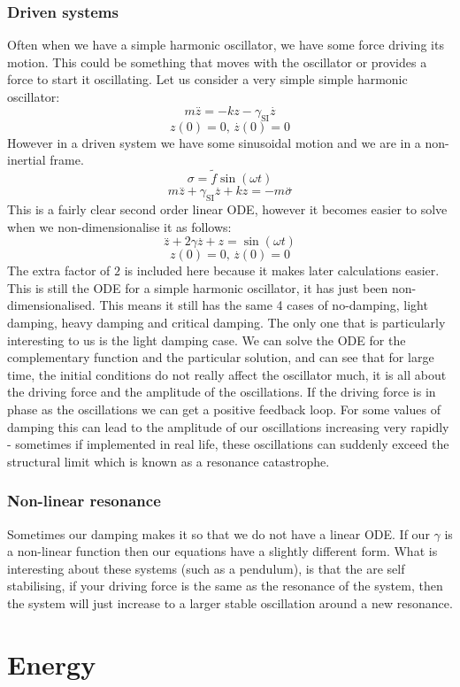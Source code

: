 \documentclass[12pt]{article}
\begin{document}
\subsubsection*{Driven systems}
Often when we have a simple harmonic oscillator, we have some force driving its motion. This could be something that moves with the oscillator or provides a force to start it oscillating. Let us consider a very simple simple harmonic oscillator:
\[m\overset{..}{z}=-kz-\gamma_{\text{SI}}\overset{.}{z}\]
\[z(0)=0,\,\overset{.}{z}(0)=0\]
However in a driven system we have some sinusoidal motion and we are in a non-inertial frame.
\[\sigma = \tilde{f}\sin(\omega t)\]
\[m\overset{..}{z}+\gamma_{\text{SI}}\overset{.}{z}+kz=-m\overset{..}{\sigma}\]
This is a fairly clear second order linear ODE, however it becomes easier to solve when we non-dimensionalise it as follows:
\[\overset{..}{z}+2\gamma\overset{.}{z}+z=\sin(\omega t)\]
\[z(0)=0,\,\overset{.}{z}(0)=0\]
The extra factor of \(2\) is included here because it makes later calculations easier. This is still the ODE for a simple harmonic oscillator, it has just been non-dimensionalised. This means it still has the same 4 cases of no-damping, light damping, heavy damping and critical damping. The only one that is particularly interesting to us is the light damping case. We can solve the ODE for the complementary function and the particular solution, and can see that for large time, the initial conditions do not really affect the oscillator much, it is all about the driving force and the amplitude of the oscillations. If the driving force is in phase as the oscillations we can get a positive feedback loop. For some values of damping this can lead to the amplitude of our oscillations increasing very rapidly - sometimes if implemented in real life, these oscillations can suddenly exceed the structural limit which is known as a resonance catastrophe.
\subsubsection*{Non-linear resonance}
Sometimes our damping makes it so that we do not have a linear ODE. If our \(\gamma\) is a non-linear function then our equations have a slightly different form. What is interesting about these systems (such as a pendulum), is that the are self stabilising, if your driving force is the same as the resonance of the system, then the system will just increase to a larger stable oscillation around a new resonance.
\section{Energy}
\end{document}
